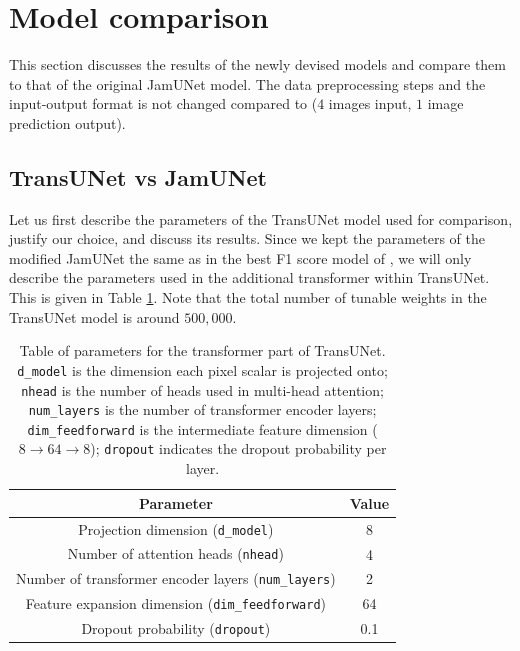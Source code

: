 \documentclass[10pt,oneside,a4paper,english]{article}
\begin{document}
\section{Model comparison} \label{section: Model comparison}
This section discusses the results of the newly devised models and compare them to that of the original JamUNet model. The data preprocessing steps and the input-output format is not changed compared to \cite{magherini2024jamunet} ($4$ images input, $1$ image prediction output).

\subsection{TransUNet vs JamUNet}
Let us first describe the parameters of the TransUNet model used for comparison, justify our choice, and discuss its results. Since we kept the parameters of the modified JamUNet the same as in the best F1 score model of \cite{magherini2024jamunet}, we will only describe the parameters used in the additional transformer within TransUNet. This is given in Table \ref{tab: TransUNet parameters}. Note that the total number of tunable weights in the TransUNet model is around $500,000$.
\begin{table}[H]
    \centering
    \begin{tabular}{|c|c|}
        \hline
        \textbf{Parameter} & \textbf{Value} \\ \hline
        Projection dimension (\texttt{d\_model}) & 8 \\ \hline
        Number of attention heads (\texttt{nhead}) & 4 \\ \hline
        Number of transformer encoder layers (\texttt{num\_layers}) & 2 \\ \hline
        Feature expansion dimension (\texttt{dim\_feedforward}) & 64 \\ \hline
        Dropout probability (\texttt{dropout}) & 0.1 \\ \hline
    \end{tabular}
    \caption{Table of parameters for the transformer part of TransUNet. 
    \texttt{d\_model} is the dimension each pixel scalar is projected onto; 
    \texttt{nhead} is the number of heads used in multi-head attention; 
    \texttt{num\_layers} is the number of transformer encoder layers; 
    \texttt{dim\_feedforward} is the intermediate feature dimension ($8 \rightarrow 64 \rightarrow 8$); 
    \texttt{dropout} indicates the dropout probability per layer.}
    \label{tab: TransUNet parameters}
\end{table}
\end{document}
